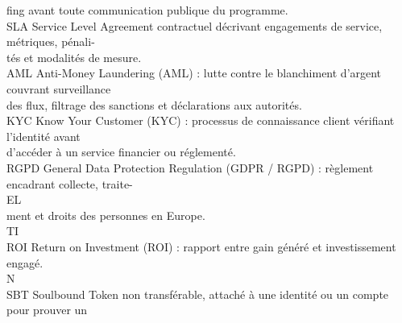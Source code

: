 \documentclass[12pt,landscape,a4paper]{article}
\begin{document}
fing avant toute communication publique du programme.\\
\vspace{0.5em}
SLA                                     Service Level Agreement contractuel décrivant engagements de service, métriques, pénali-\\
tés et modalités de mesure.\\
\vspace{0.5em}
AML                                     Anti-Money Laundering (AML) : lutte contre le blanchiment d’argent couvrant surveillance\\
des flux, filtrage des sanctions et déclarations aux autorités.\\
\vspace{0.5em}
KYC                                     Know Your Customer (KYC) : processus de connaissance client vérifiant l’identité avant\\
d’accéder à un service financier ou réglementé.\\
\vspace{0.5em}
RGPD                                    General Data Protection Regulation (GDPR / RGPD) : règlement encadrant collecte, traite-\\
\vspace{0.5em}
\vspace{0.5em}
\vspace{0.5em}
\vspace{0.5em}
EL\\
ment et droits des personnes en Europe.\\
\vspace{0.5em}
\vspace{0.5em}
\vspace{0.5em}
\vspace{0.5em}
TI\\
ROI                                     Return on Investment (ROI) : rapport entre gain généré et investissement engagé.\\
\vspace{0.5em}
\vspace{0.5em}
\vspace{0.5em}
\vspace{0.5em}
N\\
SBT                                     Soulbound Token non transférable, attaché à une identité ou un compte pour prouver un\\
\vspace{0.5em}
\vspace{0.5em}
\vspace{0.5em}
\end{document}
